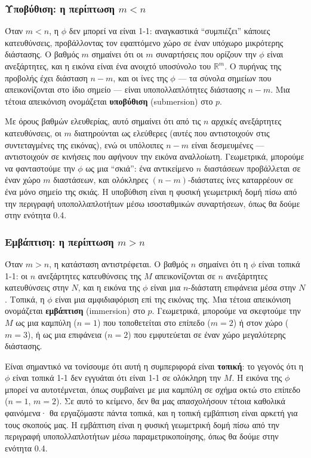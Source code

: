 \documentclass[11pt,a4paper,twoside,openright]{book}
\begin{document}
\subsubsection{Υποβύθιση: η περίπτωση $m < n$}

Όταν $m < n$, η $\phi$ δεν μπορεί να είναι 1-1: αναγκαστικά ``συμπιέζει'' κάποιες κατευθύνσεις, προβάλλοντας τον εφαπτόμενο χώρο σε έναν υπόχωρο μικρότερης διάστασης. Ο βαθμός $m$ σημαίνει ότι οι $m$ συναρτήσεις που ορίζουν την $\phi$ είναι ανεξάρτητες, και η εικόνα είναι ένα ανοιχτό υποσύνολο του $\mathbb{R}^m$. Ο πυρήνας της προβολής έχει διάσταση $n - m$, και οι ίνες της $\phi$ --- τα σύνολα σημείων που απεικονίζονται στο ίδιο σημείο --- είναι υποπολλαπλότητες διάστασης $n - m$. Μια τέτοια απεικόνιση ονομάζεται \textbf{υποβύθιση} (submersion) στο $p$.

Με όρους βαθμών ελευθερίας, αυτό σημαίνει ότι από τις $n$ αρχικές ανεξάρτητες κατευθύνσεις, οι $m$ διατηρούνται ως ελεύθερες (αυτές που αντιστοιχούν στις συντεταγμένες της εικόνας), ενώ οι υπόλοιπες $n - m$ είναι δεσμευμένες --- αντιστοιχούν σε κινήσεις που αφήνουν την εικόνα αναλλοίωτη. Γεωμετρικά, μπορούμε να φανταστούμε την $\phi$ ως μια ``σκιά'': ένα αντικείμενο $n$ διαστάσεων προβάλλεται σε έναν χώρο $m$ διαστάσεων, και ολόκληρες $(n-m)$-διάστατες ίνες καταρρέουν σε ένα μόνο σημείο της σκιάς. Η υποβύθιση είναι η φυσική γεωμετρική δομή πίσω από την περιγραφή υποπολλαπλοτήτων μέσω ισοσταθμικών συναρτήσεων, όπως θα δούμε στην ενότητα 0.4.

\subsubsection{Εμβάπτιση: η περίπτωση $m > n$}

Όταν $m > n$, η κατάσταση αντιστρέφεται. Ο βαθμός $n$ σημαίνει ότι η $\phi$ είναι τοπικά 1-1: οι $n$ ανεξάρτητες κατευθύνσεις της $M$ απεικονίζονται σε $n$ ανεξάρτητες κατευθύνσεις στην $N$, και η εικόνα της $\phi$ είναι μια $n$-διάστατη επιφάνεια μέσα στην $N$. Τοπικά, η $\phi$ είναι μια αμφιδιαφόριση επί της εικόνας της. Μια τέτοια απεικόνιση ονομάζεται \textbf{εμβάπτιση} (immersion) στο $p$. Γεωμετρικά, μπορούμε να σκεφτούμε την $M$ ως μια καμπύλη ($n=1$) που τοποθετείται στο επίπεδο ($m=2$) ή στον χώρο ($m=3$), ή ως μια επιφάνεια ($n=2$) που εμφυτεύεται σε έναν χώρο μεγαλύτερης διάστασης.

Είναι σημαντικό να τονίσουμε ότι αυτή η συμπεριφορά είναι \textbf{τοπική}: το γεγονός ότι η $\phi$ είναι τοπικά 1-1 δεν εγγυάται ότι είναι 1-1 σε ολόκληρη την $M$. Η εικόνα της $\phi$ μπορεί να αυτοτέμνεται, όπως συμβαίνει με μια καμπύλη σε σχήμα οκτώ στο επίπεδο ($n=1$, $m=2$). Σε αυτό το κείμενο, δεν θα μας απασχολήσουν τέτοια καθολικά φαινόμενα· θα εργαζόμαστε πάντα τοπικά, και η τοπική εμβάπτιση είναι αρκετή για τους σκοπούς μας. Η εμβάπτιση είναι η φυσική γεωμετρική δομή πίσω από την περιγραφή υποπολλαπλοτήτων μέσω παραμετρικοποίησης, όπως θα δούμε στην ενότητα 0.4.
\end{document}
